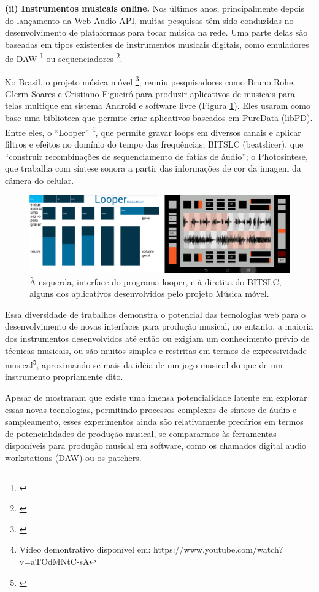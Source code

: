 \textbf{(ii) Instrumentos musicais online.} Nos últimos anos, principalmente depois do lançamento da Web Audio API, muitas pesquisas têm sido conduzidas no desenvolvimento de plataformas para tocar música na rede. Uma parte delas são baseadas em tipos existentes de instrumentos musicais digitais, como emuladores de DAW \footnote{\cite{Jillings2017}} ou sequenciadores \footnote{\cite{Feenstra2016}}.

No Brasil, o projeto música móvel \footnote{\cite{Rohde2014}}, reuniu pesquisadores como Bruno Rohe, Glerm Soares e Cristiano Figueiró para produzir aplicativos de musicais para telas multique em sistema Android e software livre (Figura \ref{mmovel}). Eles usaram como base uma biblioteca que permite criar aplicativos baseados em PureData (libPD). Entre eles, o ``Looper'' \footnote{Vídeo demontrativo disponível em: https://www.youtube.com/watch?v=aTOdMNtC-sA}, que permite gravar loops em diversos canais e aplicar filtros e efeitos no domínio do tempo das frequências; B\/I\/T\/S\/L\/C (beatslicer), que ``construir
recombinações de sequenciamento de fatias de áudio''; o Photosíntese, que trabalha com síntese sonora a partir das informações de cor da imagem da câmera do celular.

\begin{figure}
    \caption{\label{mmovel}À esquerda, interface do programa looper, e à diretita do B\/I\/T\/S\/L\/C, alguns dos aplicativos desenvolvidos pelo projeto Música móvel.}
    
        \includegraphics[width=1\linewidth]{pictures/cap2/musicamovel}
    
\end{figure}



Essa diversidade de trabalhos demonstra o potencial das tecnologias web para o desenvolvimento de novas interfaces para produção musical, no entanto, a maioria dos instrumentos desenvolvidos até então ou exigiam um conhecimento prévio de técnicas musicais, ou são muitos simples e restritas em termos de expressividade musical\footnote{\cite{Dobrian2006}}, aproximando-se mais da idéia de um jogo musical do que de um instrumento propriamente dito. 


Apesar de mostraram que existe uma imensa potencialidade latente em explorar essas novas tecnologias, permitindo processos complexos de síntese de áudio e sampleamento, esses experimentos ainda são relativamente precários em termos de potencialidades de produção musical, se compararmos às ferramentas disponíveis para produção musical em software, como os chamados digital audio workstations (DAW) ou os patchers.